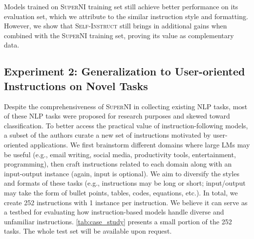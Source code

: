 \documentclass[11pt]{article}
\newcommand{\nascomment}[1]{\textcolor{blue}{\textbf{[#1 -- \textsc{nas}]}}}
\newcommand{\name}{\textsc{Self-Instruct}}
\newcommand{\supernatShort}{\textsc{SuperNI}}
\begin{document}
Models trained on \supernatShort{} training set still achieve better performance on its evaluation set, which we attribute to the similar instruction style and formatting. However, we show that \name{} still brings in additional gains when combined with the \supernatShort{} training set, proving its value as complementary data. 



\subsection{Experiment 2: Generalization to User-oriented Instructions on Novel Tasks}
\label{sec:user_instructions}

Despite the comprehensiveness of \supernatShort{} in collecting existing NLP tasks, most of these NLP tasks were proposed for research purposes and skewed toward classification. To better access the practical value of instruction-following models, a subset of the authors curate a new set of instructions motivated by user-oriented applications. 
We first brainstorm different domains where large LMs may be useful (e.g., email writing, social media, productivity tools, entertainment, programming), then craft instructions related to each domain along with an input-output instance (again, input is optional). We aim to diversify the styles and formats of these tasks (e.g., instructions may be long or short; input/output may take the form of bullet points, tables, codes, equations, etc.). In total, we create 252 instructions with 1 instance per instruction. We believe it can serve as a testbed for evaluating how instruction-based models handle diverse and unfamiliar instructions. \autoref{tab:case_study} presents a small portion of the 252 tasks. The whole test set will be available upon request.
\end{document}
